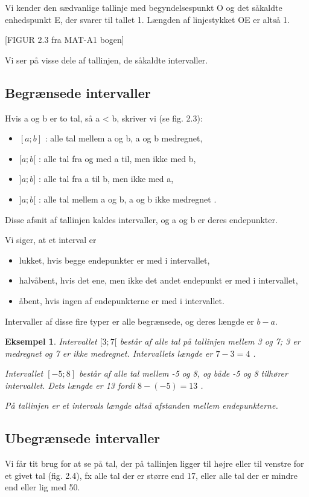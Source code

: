 \documentclass[12pt,oneside,a4paper]{article}
\newtheorem{eks}[thm]{Eksempel}
\begin{document}
Vi kender den sædvanlige tallinje med begyndelsespunkt O og det såkaldte
enhedspunkt E, der svarer til tallet 1. Længden af linjestykket OE er altså 1.

[FIGUR 2.3 fra MAT-A1 bogen]

Vi ser på visse dele af tallinjen, de såkaldte intervaller.

\subsection{Begrænsede intervaller}
Hvis a og b er to tal, så a < b, skriver vi (se fig. 2.3):
\begin{itemize}
    \item $[a;b]$ : alle tal mellem a og b, a og b medregnet,
    \item $[a;b[$ : alle tal fra og med a til, men ikke med b,
    \item $]a;b]$ : alle tal fra a til b, men ikke med a,
    \item $]a;b[$ : alle tal mellem a og b, a og b ikke medregnet .
\end{itemize}
Disse afsnit af tallinjen kaldes intervaller, og a og b er deres endepunkter.

Vi siger, at et interval er
\begin{itemize}
    \item lukket, hvis begge endepunkter er med i intervallet,
    \item halvåbent, hvis det ene, men ikke det andet endepunkt er med i intervallet,
    \item åbent, hvis ingen af endepunkterne er med i intervallet.
\end{itemize}
Intervaller af disse fire typer er alle begrænsede, og deres længde er $b-a$.

\begin{eks}
Intervallet $[3;7[$ består af alle tal på tallinjen mellem 3 og 7; 3 er
medregnet og 7 er ikke medregnet. Intervallets længde er $7-3 = 4$ .

Intervallet $[-5;8]$ består af alle tal mellem -5 og 8, og både -5 og 8
tilhører intervallet. Dets længde er 13 fordi $8 - (-5) = 13$ .

På tallinjen er et intervals længde altså afstanden mellem endepunkterne.
\end{eks}

\subsection{Ubegrænsede intervaller}
Vi får tit brug for at se på tal, der på tallinjen ligger til højre eller til
venstre for et givet tal (fig. 2.4), fx alle tal der er større end 17, eller
alle tal der er mindre end eller lig med 50.
\end{document}
